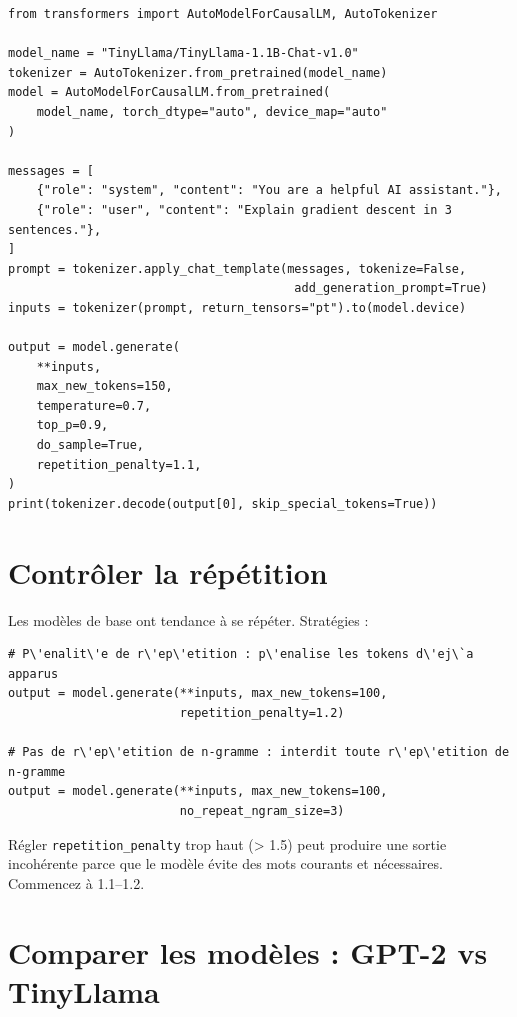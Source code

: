 \begin{verbatim}
from transformers import AutoModelForCausalLM, AutoTokenizer

model_name = "TinyLlama/TinyLlama-1.1B-Chat-v1.0"
tokenizer = AutoTokenizer.from_pretrained(model_name)
model = AutoModelForCausalLM.from_pretrained(
    model_name, torch_dtype="auto", device_map="auto"
)

messages = [
    {"role": "system", "content": "You are a helpful AI assistant."},
    {"role": "user", "content": "Explain gradient descent in 3 sentences."},
]
prompt = tokenizer.apply_chat_template(messages, tokenize=False,
                                        add_generation_prompt=True)
inputs = tokenizer(prompt, return_tensors="pt").to(model.device)

output = model.generate(
    **inputs,
    max_new_tokens=150,
    temperature=0.7,
    top_p=0.9,
    do_sample=True,
    repetition_penalty=1.1,
)
print(tokenizer.decode(output[0], skip_special_tokens=True))
\end{verbatim}

\section{Contr\^oler la r\'ep\'etition}

Les mod\`eles de base ont tendance \`a se r\'ep\'eter. Strat\'egies :

\begin{verbatim}
# P\'enalit\'e de r\'ep\'etition : p\'enalise les tokens d\'ej\`a apparus
output = model.generate(**inputs, max_new_tokens=100,
                        repetition_penalty=1.2)

# Pas de r\'ep\'etition de n-gramme : interdit toute r\'ep\'etition de n-gramme
output = model.generate(**inputs, max_new_tokens=100,
                        no_repeat_ngram_size=3)
\end{verbatim}

\begin{warningbox}
R\'egler \texttt{repetition\_penalty} trop haut (> 1.5) peut produire une sortie incoh\'erente parce que le mod\`ele \'evite des mots courants et n\'ecessaires. Commencez \`a 1.1--1.2.
\end{warningbox}

\section{Comparer les mod\`eles : GPT-2 vs TinyLlama}

